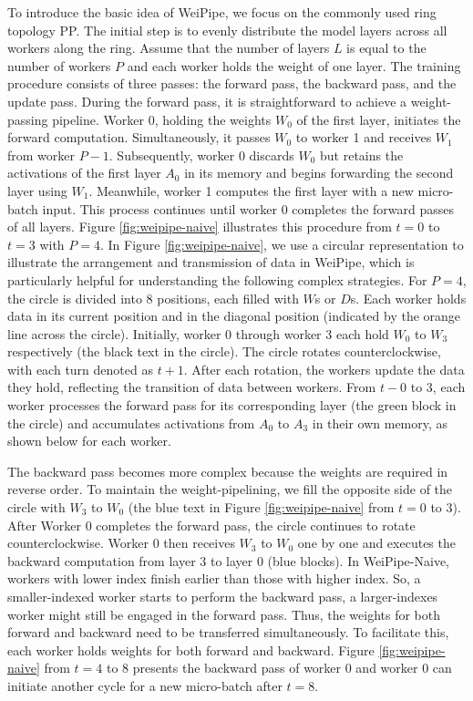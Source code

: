 \documentclass[sigplan,screen]{acmart}
\begin{document}
To introduce the basic idea of WeiPipe, we focus on the commonly used ring topology PP. The initial step is to evenly distribute the model layers across all workers along the ring. Assume that the number of layers $L$ is equal to the number of workers $P$ and each worker holds the weight of one layer. The training procedure consists of three passes: the forward pass, the backward pass, and the update pass. During the forward pass, it is straightforward to achieve a weight-passing pipeline. Worker 0, holding the weights $W_0$ of the first layer, initiates the forward computation. Simultaneously, it passes $W_0$ to worker 1 and receives $W_1$ from worker $P-1$. Subsequently, worker 0 discards $W_0$ but retains the activations of the first layer $A_0$ in its memory and begins forwarding the second layer using $W_1$. Meanwhile, worker 1 computes the first layer with a new micro-batch input. This process continues until worker 0 completes the forward passes of all layers. Figure \ref{fig:weipipe-naive} illustrates this procedure from $t=0$ to $t=3$ with $P=4$. In Figure \ref{fig:weipipe-naive}, we use a circular representation to illustrate the arrangement and transmission of data in WeiPipe, which is particularly helpful for understanding the following complex strategies. For $P=4$, the circle is divided into 8 positions, each filled with $W$s or $D$s. Each worker holds data in its current position and in the diagonal position (indicated by the orange line across the circle). Initially, worker 0 through worker 3 each hold $W_0$ to $W_3$ respectively (the black text in the circle). The circle rotates counterclockwise, with each turn denoted as $t+1$. After each rotation, the workers update the data they hold, reflecting the transition of data between workers. From $t-0$ to $3$, each worker processes the forward pass for its corresponding layer (the green block in the circle) and accumulates activations from $A_0$ to $A_3$ in their own memory, as shown below for each worker. 

The backward pass becomes more complex because the weights are required in reverse order. To maintain the weight-pipelining, we fill the opposite side of the circle with $W_3$ to $W_0$ (the blue text in Figure \ref{fig:weipipe-naive} from $t=0$ to $3$). After Worker 0 completes the forward pass, the circle continues to rotate counterclockwise. Worker 0 then receives $W_3$ to $W_0$ one by one and executes the backward computation from layer 3 to layer 0 (blue blocks). In WeiPipe-Naive, workers with lower index finish earlier than those with higher index. So, a smaller-indexed worker starts to perform the backward pass, a larger-indexes worker might still be engaged in the forward pass. Thus, the weights for both forward and backward need to be transferred simultaneously. To facilitate this, each worker holds weights for both forward and backward. Figure \ref{fig:weipipe-naive} from $t=4$ to $8$ presents the backward pass of worker 0 and worker 0 can initiate another cycle for a new micro-batch after $t=8$. 
\end{document}
